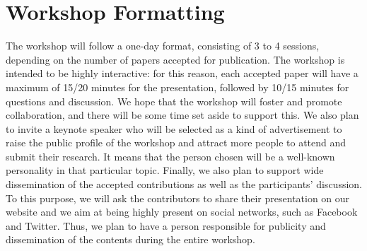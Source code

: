 \section{Workshop Formatting}
\label{sec:format}

The workshop will follow a one-day format, consisting of 3 to 4 sessions, depending on the number of papers accepted for publication.
The workshop is intended to be highly interactive: for this reason, each accepted paper will have a maximum of 15/20 minutes for the presentation, followed by 10/15 minutes for questions and discussion.
We hope that the workshop will foster and promote collaboration, and there will be some time set aside to support this.
We also plan to invite a keynote speaker who will be selected as a kind of advertisement to raise the public profile of the workshop and attract more people to attend and submit their research.
It means that the person chosen will be a well-known personality in that particular topic.
Finally, we also plan to support wide dissemination of the accepted contributions as well as the participants’ discussion.
To this purpose, we will ask the contributors to share their presentation on our website and we aim at being highly present on social networks, such as Facebook and Twitter.
Thus, we plan to have a person responsible for publicity and dissemination of the contents during the entire workshop.

